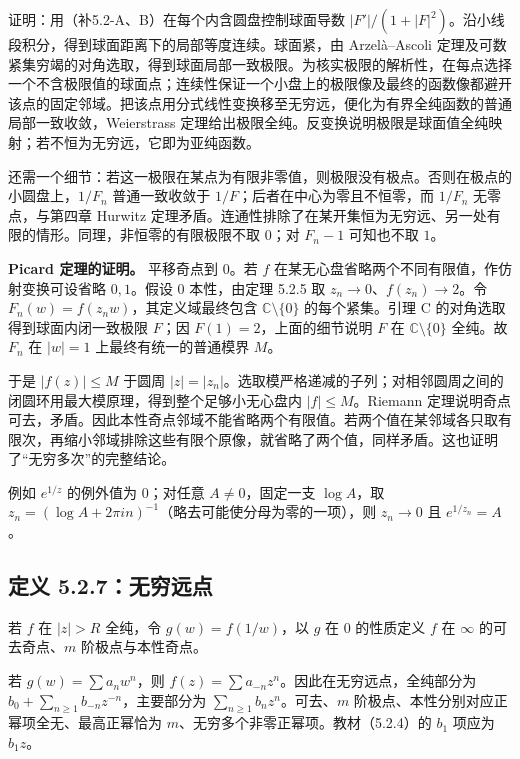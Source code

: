 \documentclass[11pt,a4paper]{article}
\begin{document}
证明：用（补5.2-A、B）在每个内含圆盘控制球面导数
\(|F'|/(1+|F|^2)\)。沿小线段积分，得到球面距离下的局部等度连续。球面紧，由
Arzelà--Ascoli
定理及可数紧集穷竭的对角选取，得到球面局部一致极限。为核实极限的解析性，在每点选择一个不含极限值的球面点；连续性保证一个小盘上的极限像及最终的函数像都避开该点的固定邻域。把该点用分式线性变换移至无穷远，便化为有界全纯函数的普通局部一致收敛，Weierstrass
定理给出极限全纯。反变换说明极限是球面值全纯映射；若不恒为无穷远，它即为亚纯函数。

还需一个细节：若这一极限在某点为有限非零值，则极限没有极点。否则在极点的小圆盘上，\(1/F_n\)
普通一致收敛于 \(1/F\)；后者在中心为零且不恒零，而 \(1/F_n\)
无零点，与第四章 Hurwitz
定理矛盾。连通性排除了在某开集恒为无穷远、另一处有限的情形。同理，非恒零的有限极限不取
\(0\)；对 \(F_n-1\) 可知也不取 \(1\)。

\textbf{Picard 定理的证明。} 平移奇点到 \(0\)。若 \(f\)
在某无心盘省略两个不同有限值，作仿射变换可设省略 \(0,1\)。假设 \(0\)
本性，由定理 5.2.5 取 \(z_n\to0\)、\(f(z_n)\to2\)。令
\(F_n(w)=f(z_n w)\)，其定义域最终包含 \(\mathbb C\setminus\{0\}\)
的每个紧集。引理 C 的对角选取得到球面内闭一致极限 \(F\)；因
\(F(1)=2\)，上面的细节说明 \(F\) 在 \(\mathbb C\setminus\{0\}\) 全纯。故
\(F_n\) 在 \(|w|=1\) 上最终有统一的普通模界 \(M\)。

于是 \(|f(z)|\le M\) 于圆周
\(|z|=|z_n|\)。选取模严格递减的子列；对相邻圆周之间的闭圆环用最大模原理，得到整个足够小无心盘内
\(|f|\le M\)。Riemann
定理说明奇点可去，矛盾。因此本性奇点邻域不能省略两个有限值。若两个值在某邻域各只取有限次，再缩小邻域排除这些有限个原像，就省略了两个值，同样矛盾。这也证明了``无穷多次''的完整结论。

例如 \(e^{1/z}\) 的例外值为 \(0\)；对任意 \(A\ne0\)，固定一支
\(\log A\)，取
\(z_n=(\log A+2\pi i n)^{-1}\)（略去可能使分母为零的一项），则
\(z_n\to0\) 且 \(e^{1/z_n}=A\)。

\subsection{定义 5.2.7：无穷远点}\label{ch05-s2-heading-4}

若 \(f\) 在 \(|z|>R\) 全纯，令 \(g(w)=f(1/w)\)，以 \(g\) 在 \(0\)
的性质定义 \(f\) 在 \(\infty\) 的可去奇点、\(m\) 阶极点与本性奇点。

若 \(g(w)=\sum a_nw^n\)，则
\(f(z)=\sum a_{-n}z^n\)。因此在无穷远点，全纯部分为
\(b_0+\sum_{n\ge1}b_{-n}z^{-n}\)，主要部分为
\(\sum_{n\ge1}b_nz^n\)。可去、\(m\)
阶极点、本性分别对应正幂项全无、最高正幂恰为
\(m\)、无穷多个非零正幂项。教材（5.2.4）的 \(b_1\) 项应为 \(b_1z\)。
\end{document}
